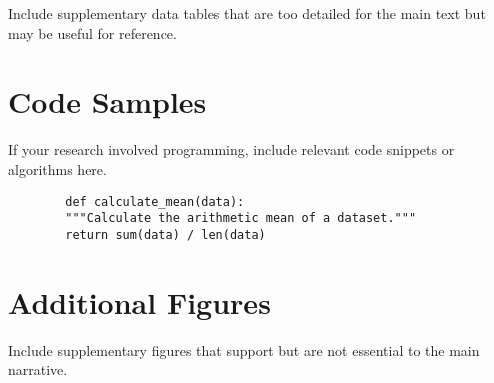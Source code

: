 \documentclass[12pt, a4paper]{report}
\begin{document}
	Include supplementary data tables that are too detailed for the main text but may be useful for reference.
	
	\chapter{Code Samples}
	\label{app:code}
	
	If your research involved programming, include relevant code snippets or algorithms here.
	
	\begin{verbatim}
		def calculate_mean(data):
		"""Calculate the arithmetic mean of a dataset."""
		return sum(data) / len(data)
	\end{verbatim}
	
	\chapter{Additional Figures}
	\label{app:figures}
	
	Include supplementary figures that support but are not essential to the main narrative.
	
\end{document}
